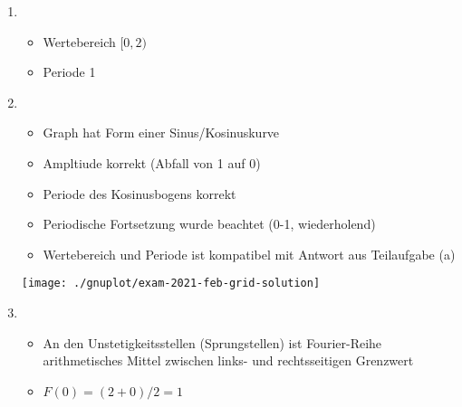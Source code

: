 \item
	\begin{enumerate}
	
		\item
			\begin{itemize}
				\item Wertebereich $[0,2)$
				\item Periode 1
			\end{itemize}
		
		\item
			\begin{itemize}
				\item Graph hat Form einer Sinus/Kosinuskurve
				\item Ampltiude korrekt (Abfall von 1 auf 0)
				\item Periode des Kosinusbogens korrekt 
				\item Periodische Fortsetzung wurde beachtet (0-1, wiederholend)
				\item Wertebereich und Periode ist kompatibel mit Antwort aus Teilaufgabe (a)
			\end{itemize}
		
			\begin{center}
				\texttt{[image: ./gnuplot/exam-2021-feb-grid-solution]}
			\end{center}
		
		\item 
			\begin{itemize}
				\item An den Unstetigkeitsstellen (Sprungstellen) ist Fourier-Reihe arithmetisches Mittel zwischen links- und rechtsseitigen Grenzwert
				\item $F(0) = (2+0)/2 = 1$
			\end{itemize}
	
	\end{enumerate}
